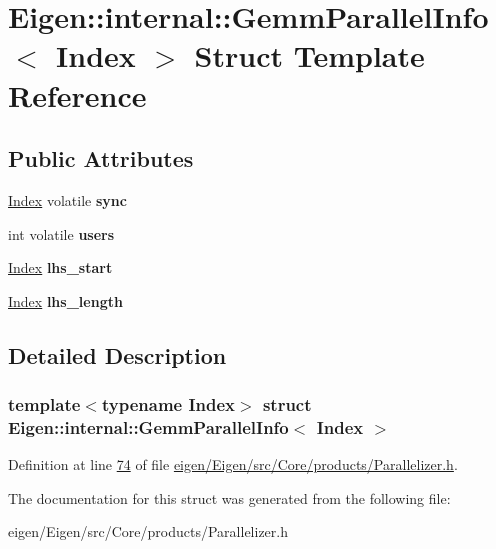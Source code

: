 \hypertarget{struct_eigen_1_1internal_1_1_gemm_parallel_info}{}\section{Eigen\+:\+:internal\+:\+:Gemm\+Parallel\+Info$<$ Index $>$ Struct Template Reference}
\label{struct_eigen_1_1internal_1_1_gemm_parallel_info}
\subsection*{Public Attributes}
\begin{DoxyCompactItemize}
\item 
\mbox{\label{struct_eigen_1_1internal_1_1_gemm_parallel_info_addd681205a1798c16f2373f15e923681}} 
\hyperlink{namespace_eigen_a62e77e0933482dafde8fe197d9a2cfde}{Index} volatile {\bfseries sync}
\item 
\mbox{\label{struct_eigen_1_1internal_1_1_gemm_parallel_info_ae2a039eef23196ca53108a2d3b8dc319}} 
int volatile {\bfseries users}
\item 
\mbox{\label{struct_eigen_1_1internal_1_1_gemm_parallel_info_a7a6a21f9b9b4a9fa4833659509333fdb}} 
\hyperlink{namespace_eigen_a62e77e0933482dafde8fe197d9a2cfde}{Index} {\bfseries lhs\+\_\+start}
\item 
\mbox{\label{struct_eigen_1_1internal_1_1_gemm_parallel_info_a6709199f56602a45662c9eb6c1178dd2}} 
\hyperlink{namespace_eigen_a62e77e0933482dafde8fe197d9a2cfde}{Index} {\bfseries lhs\+\_\+length}
\end{DoxyCompactItemize}


\subsection{Detailed Description}
\subsubsection*{template$<$typename Index$>$\newline
struct Eigen\+::internal\+::\+Gemm\+Parallel\+Info$<$ Index $>$}



Definition at line \hyperlink{eigen_2_eigen_2src_2_core_2products_2_parallelizer_8h_source_l00074}{74} of file \hyperlink{eigen_2_eigen_2src_2_core_2products_2_parallelizer_8h_source}{eigen/\+Eigen/src/\+Core/products/\+Parallelizer.\+h}.



The documentation for this struct was generated from the following file\+:\begin{DoxyCompactItemize}
\item 
eigen/\+Eigen/src/\+Core/products/\+Parallelizer.\+h\end{DoxyCompactItemize}
